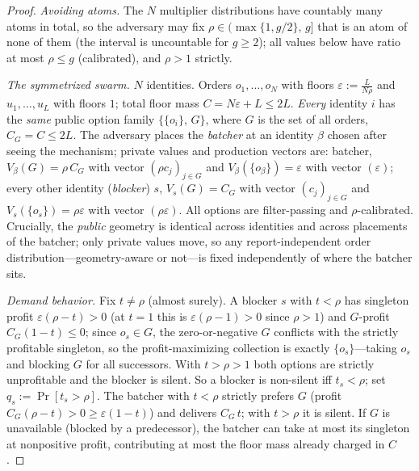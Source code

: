 \documentclass[11pt]{article}
\theoremstyle{remark}
\begin{document}
\begin{proof}
\emph{Avoiding atoms.} The $N$ multiplier distributions have countably
many atoms in total, so the adversary may fix
$\rho\in\big(\max\{1,g/2\},\,g\big]$ that is an atom of none of them
(the interval is uncountable for $g\ge2$); all values below have ratio at
most $\rho\le g$ (calibrated), and $\rho>1$ strictly.

\emph{The symmetrized swarm.} $N$ identities. Orders $o_1,\dots,o_N$ with
floors $\varepsilon:=\frac{L}{N\rho}$ and $u_1,\dots,u_L$ with floors
$1$; total floor mass $C=N\varepsilon+L\le2L$. \emph{Every} identity $i$
has the \emph{same} public option family
$\{\{o_i\},\,G\}$, where $G$ is the set of all orders, $C_G=C\le2L$.
The adversary places the \emph{batcher} at an identity $\beta$ chosen
after seeing the mechanism; private values and production vectors are:
batcher, $V_\beta(G)=\rho\,C_G$ with vector $(\rho c_j)_{j\in G}$ and
$V_\beta(\{o_\beta\})=\varepsilon$ with vector $(\varepsilon)$; every
other identity (\emph{blocker}) $s$, $V_s(G)=C_G$ with vector
$(c_j)_{j\in G}$ and $V_s(\{o_s\})=\rho\varepsilon$ with vector
$(\rho\varepsilon)$. All options are filter-passing and
$\rho$-calibrated. Crucially, the \emph{public} geometry is identical
across identities and across placements of the batcher; only private
values move, so any report-independent order distribution---geometry-aware
or not---is fixed independently of where the batcher sits.

\emph{Demand behavior.} Fix $t\ne\rho$ (almost surely). A blocker $s$
with $t<\rho$ has singleton profit $\varepsilon(\rho-t)>0$ (at $t=1$ this
is $\varepsilon(\rho-1)>0$ since $\rho>1$) and $G$-profit
$C_G(1-t)\le0$; since $o_s\in G$, the zero-or-negative $G$ conflicts with
the strictly profitable singleton, so the profit-maximizing collection is
exactly $\{o_s\}$---taking $o_s$ and blocking $G$ for all successors.
With $t>\rho>1$ both options are strictly unprofitable
and the blocker is silent. So a blocker is non-silent iff $t_s<\rho$; set
$q_s:=\Pr[t_s>\rho]$. The batcher with $t<\rho$ strictly prefers $G$
(profit $C_G(\rho-t)>0\ge\varepsilon(1-t)$) and delivers $C_G\,t$; with
$t>\rho$ it is silent. If $G$ is unavailable (blocked by a predecessor),
the batcher can take at most its singleton at nonpositive profit,
contributing at most the floor mass already charged in $C$.


\end{proof}
\end{document}
